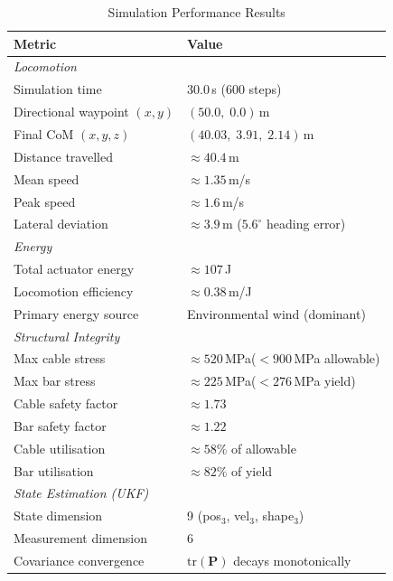 \documentclass[conference]{IEEEtran}
\begin{document}
\begin{table}[htbp]
\centering
\caption{Simulation Performance Results}
\label{tab:performance}
\begin{tabular}{l l}
\hline
\textbf{Metric} & \textbf{Value} \\
\hline
\multicolumn{2}{l}{\textit{Locomotion}} \\
Simulation time          & 30.0\,s (600 steps) \\
Directional waypoint $(x,y)$ & $(50.0,\;0.0)$\,m \\
Final CoM $(x,y,z)$     & $(40.03,\;3.91,\;2.14)$\,m \\
Distance travelled       & $\approx 40.4$\,m \\
Mean speed               & $\approx 1.35$\,m/s \\
Peak speed               & $\approx 1.6$\,m/s \\
Lateral deviation        & $\approx 3.9$\,m ($5.6^\circ$ heading error) \\
\hline
\multicolumn{2}{l}{\textit{Energy}} \\
Total actuator energy    & $\approx 107$\,J \\
Locomotion efficiency    & $\approx 0.38$\,m/J \\
Primary energy source    & Environmental wind (dominant) \\
\hline
\multicolumn{2}{l}{\textit{Structural Integrity}} \\
Max cable stress         & $\approx 520$\,MPa\;($<900$\,MPa allowable) \\
Max bar stress           & $\approx 225$\,MPa\;($<276$\,MPa yield) \\
Cable safety factor      & $\approx 1.73$ \\
Bar safety factor        & $\approx 1.22$ \\
Cable utilisation        & $\approx 58\%$ of allowable \\
Bar utilisation          & $\approx 82\%$ of yield \\
\hline
\multicolumn{2}{l}{\textit{State Estimation (UKF)}} \\
State dimension          & 9 (pos$_3$, vel$_3$, shape$_3$) \\
Measurement dimension    & 6 \\
Covariance convergence   & $\mathrm{tr}(\mathbf{P})$ decays monotonically \\
\hline
\end{tabular}
\end{table}
\end{document}
